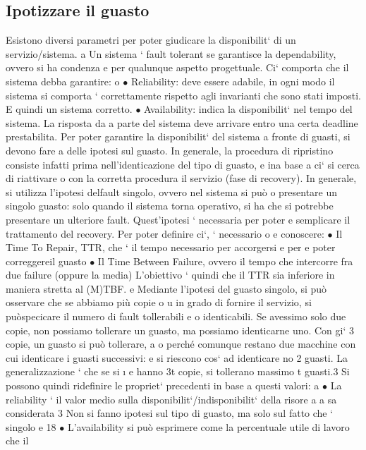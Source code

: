 \documentclass[a4paper,12pt]{article}
\begin{document}
\subsection{Ipotizzare il guasto}
Esistono diversi parametri per poter giudicare la disponibilit` di un servizio/sistema.
a
Un sistema ` fault tolerant se garantisce la dependability, ovvero si ha condenza
e
per qualunque aspetto progettuale. Ci` comporta che il sistema debba garantire:
o
$\bullet$ Reliability: deve essere adabile, in ogni modo il sistema si comporta
`
correttamente rispetto agli invarianti che sono stati imposti. E quindi un
sistema corretto.
$\bullet$ Availability: indica la disponibilit` nel tempo del sistema. La risposta da
a
parte del sistema deve arrivare entro una certa deadline prestabilita.
Per poter garantire la disponibilit` del sistema a fronte di guasti, si devono fare
a
delle ipotesi sul guasto. In generale, la procedura di ripristino consiste infatti
prima nell'identicazione del tipo di guasto, e ina base a ci` si cerca di riattivare
o
con la corretta procedura il servizio (fase di recovery).
In generale, si utilizza l'ipotesi delfault singolo, ovvero nel sistema si può
o
presentare un singolo guasto: solo quando il sistema torna operativo, si ha che
si potrebbe presentare un ulteriore fault. Quest'ipotesi ` necessaria per poter
e
semplicare il trattamento del recovery. Per poter definire ci`, ` necessario
o e
conoscere:
$\bullet$ Il Time To Repair, TTR, che ` il tempo necessario per accorgersi e per
e
poter correggereil guasto
$\bullet$ Il Time Between Failure, ovvero il tempo che intercorre fra due failure
(oppure la media)
L'obiettivo ` quindi che il TTR sia inferiore in maniera stretta al (M)TBF.
e
Mediante l'ipotesi del guasto singolo, si può osservare che se abbiamo più copie
o
u
in grado di fornire il servizio, si puòspecicare il numero di fault tollerabili e
o
identicabili. Se avessimo solo due copie, non possiamo tollerare un guasto,
ma possiamo identicarne uno. Con gi` 3 copie, un guasto si può tollerare,
a
o
perché comunque restano due macchine con cui identicare i guasti successivi:
e
si riescono cos` ad identicare no 2 guasti. La generalizzazione ` che se si
\i{}
e
hanno 3t copie, si tollerano massimo t guasti.3 Si possono quindi ridefinire le
propriet` precedenti in base a questi valori:
a
$\bullet$ La reliability ` il valor medio sulla disponibilit`/indisponibilit` della risore
a
a
sa considerata
3 Non
si fanno ipotesi sul tipo di guasto, ma solo sul fatto che ` singolo
e
18
$\bullet$ L'availability si può esprimere come la percentuale utile di lavoro che il
\end{document}
